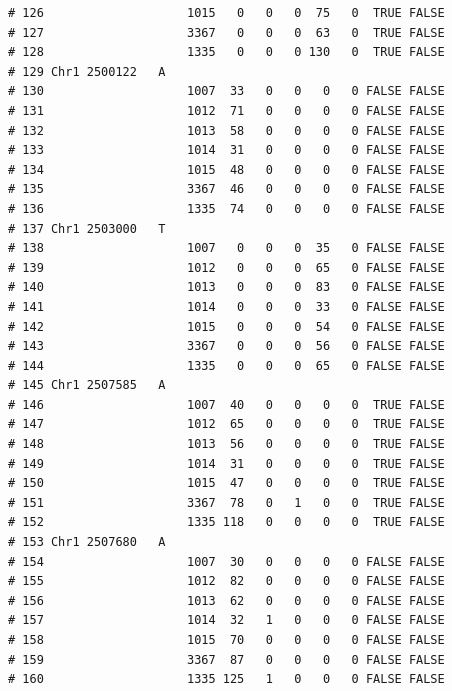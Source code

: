 \documentclass{article}\usepackage[]{graphicx}\usepackage[]{color}
\makeatletter
\newenvironment{kframe}{%
 \def\at@end@of@kframe{}%
 \ifinner\ifhmode%
  \def\at@end@of@kframe{\end{minipage}}%
  \begin{minipage}{\columnwidth}%
 \fi\fi%
 \def\FrameCommand##1{\hskip\@totalleftmargin \hskip-\fboxsep
 \colorbox{shadecolor}{##1}\hskip-\fboxsep
     \hskip-\linewidth \hskip-\@totalleftmargin \hskip\columnwidth}%
 \MakeFramed {\advance\hsize-\width
   \@totalleftmargin\z@ \linewidth\hsize
   \@setminipage}}%
 {\par\unskip\endMakeFramed%
 \at@end@of@kframe}
\newenvironment{knitrout}{}{} %
\makeatother
\begin{document}
\begin{knitrout}
\begin{kframe}
\begin{verbatim}
# 126                    1015   0   0   0  75   0  TRUE FALSE        
# 127                    3367   0   0   0  63   0  TRUE FALSE        
# 128                    1335   0   0   0 130   0  TRUE FALSE        
# 129 Chr1 2500122   A                                               
# 130                    1007  33   0   0   0   0 FALSE FALSE        
# 131                    1012  71   0   0   0   0 FALSE FALSE        
# 132                    1013  58   0   0   0   0 FALSE FALSE        
# 133                    1014  31   0   0   0   0 FALSE FALSE        
# 134                    1015  48   0   0   0   0 FALSE FALSE        
# 135                    3367  46   0   0   0   0 FALSE FALSE        
# 136                    1335  74   0   0   0   0 FALSE FALSE        
# 137 Chr1 2503000   T                                               
# 138                    1007   0   0   0  35   0 FALSE FALSE        
# 139                    1012   0   0   0  65   0 FALSE FALSE        
# 140                    1013   0   0   0  83   0 FALSE FALSE        
# 141                    1014   0   0   0  33   0 FALSE FALSE        
# 142                    1015   0   0   0  54   0 FALSE FALSE        
# 143                    3367   0   0   0  56   0 FALSE FALSE        
# 144                    1335   0   0   0  65   0 FALSE FALSE        
# 145 Chr1 2507585   A                                               
# 146                    1007  40   0   0   0   0  TRUE FALSE        
# 147                    1012  65   0   0   0   0  TRUE FALSE        
# 148                    1013  56   0   0   0   0  TRUE FALSE        
# 149                    1014  31   0   0   0   0  TRUE FALSE        
# 150                    1015  47   0   0   0   0  TRUE FALSE        
# 151                    3367  78   0   1   0   0  TRUE FALSE        
# 152                    1335 118   0   0   0   0  TRUE FALSE        
# 153 Chr1 2507680   A                                               
# 154                    1007  30   0   0   0   0 FALSE FALSE        
# 155                    1012  82   0   0   0   0 FALSE FALSE        
# 156                    1013  62   0   0   0   0 FALSE FALSE        
# 157                    1014  32   1   0   0   0 FALSE FALSE        
# 158                    1015  70   0   0   0   0 FALSE FALSE        
# 159                    3367  87   0   0   0   0 FALSE FALSE        
# 160                    1335 125   1   0   0   0 FALSE FALSE
\end{verbatim}
\end{kframe}
\end{knitrout}
\end{document}
